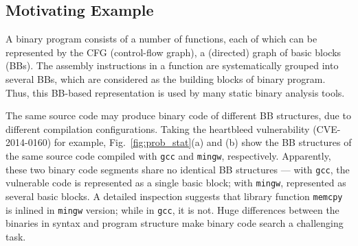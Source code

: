 \subsection{Motivating Example}  \label{subsec:bin_pre}

A binary program consists of a number of functions, each of which can be represented by the CFG (control-flow graph), a (directed) graph of basic blocks (BBs). The assembly instructions in a function are systematically  grouped into several BBs, which are considered as the building blocks of binary program. Thus, this BB-based representation is used by many static binary analysis tools.

 The same source code may produce binary code of different BB structures, due to different compilation configurations. Taking the heartbleed vulnerability (CVE-2014-0160) for example, Fig.~\ref{fig:prob_stat}(a) and (b) show the BB structures of the same source code compiled with \texttt{gcc} and \texttt{mingw}, respectively. Apparently, these two binary code segments share no identical BB structures --- with \texttt{gcc}, the vulnerable code is represented as a single basic block;  with \texttt{mingw}, represented as several basic blocks. A detailed inspection suggests that  library function \texttt{memcpy} is inlined in \texttt{mingw} version; while in \texttt{gcc}, it is not. %
Huge differences between the binaries in syntax and program structure make binary code search a challenging task.

